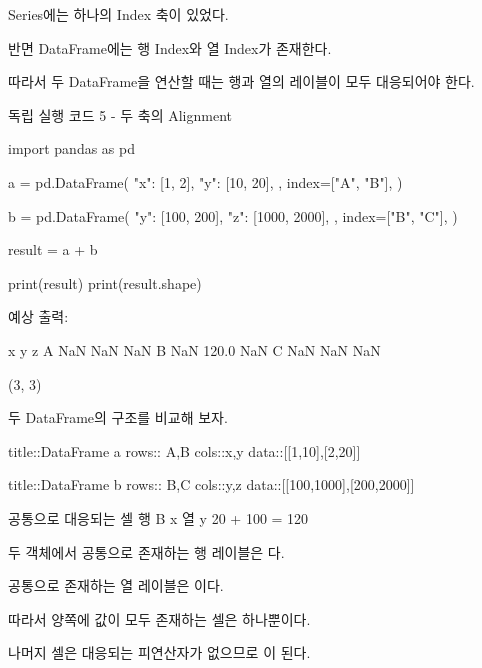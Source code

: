 Series에는 하나의 Index 축이 있었다.

반면 DataFrame에는 행 Index와 열 Index가 존재한다.

따라서 두 DataFrame을 연산할 때는 행과 열의 레이블이 모두 대응되어야 한다.

\begin{dhknote}
\begin{dhksmry}[centered]
독립 실행 코드 5 - 두 축의 Alignment
\end{dhksmry}
\end{dhknote}

\begin{dhkcode}
import pandas as pd

a = pd.DataFrame(
    {
        "x": [1, 2],
        "y": [10, 20],
    },
    index=["A", "B"],
)

b = pd.DataFrame(
    {
        "y": [100, 200],
        "z": [1000, 2000],
    },
    index=["B", "C"],
)

result = a + b

print(result)
print(result.shape)
\end{dhkcode}

예상 출력:

\begin{dhkzsh}
    x      y   z
A NaN    NaN NaN
B NaN  120.0 NaN
C NaN    NaN NaN

(3, 3)
\end{dhkzsh}

두 DataFrame의 구조를 비교해 보자.

\begin{dhkmatrix}[delim=none,style=cards]
title::DataFrame a
rows:: A,B
cols::x,y
data::[[1,10],[2,20]]
\end{dhkmatrix}

\begin{dhkmatrix}[delim=none,style=cards]
title::DataFrame b
rows:: B,C
cols::y,z
data::[[100,1000],[200,2000]]
\end{dhkmatrix}

\begin{dhksmry}[centered]
공통으로 대응되는 셀
행 B x 열 y
20 + 100 = 120
\end{dhksmry}

두 객체에서 공통으로 존재하는 행 레이블은 다.

공통으로 존재하는 열 레이블은 이다.

따라서 양쪽에 값이 모두 존재하는 셀은  하나뿐이다.

나머지 셀은 대응되는 피연산자가 없으므로 이 된다.

